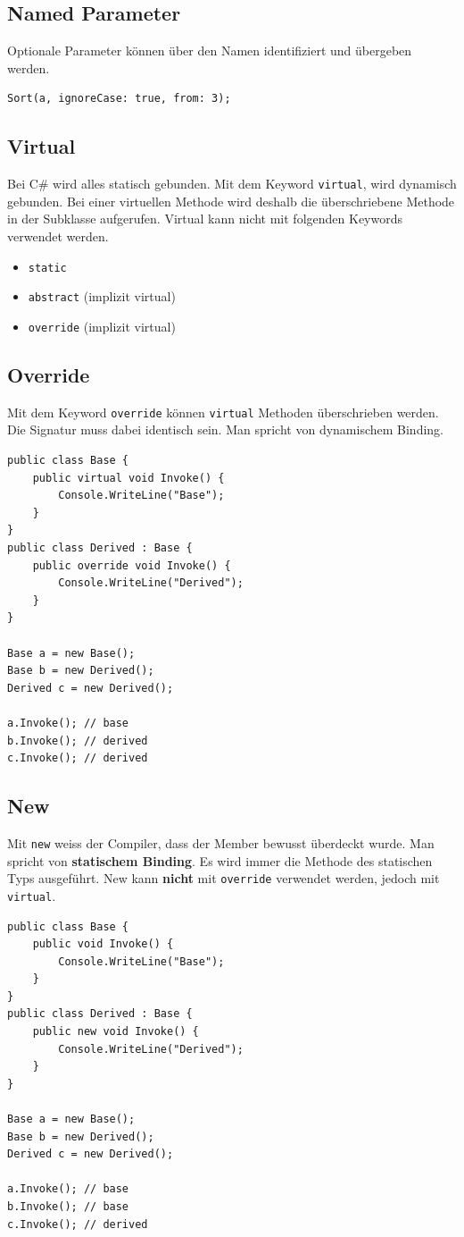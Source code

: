 \subsection{Named Parameter}
Optionale Parameter können über den Namen identifiziert und übergeben werden.
\begin{lstlisting}
Sort(a, ignoreCase: true, from: 3);
\end{lstlisting}

\subsection{Virtual}
Bei C\# wird alles statisch gebunden. Mit dem Keyword \lstinline|virtual|, wird dynamisch gebunden. Bei einer virtuellen Methode wird deshalb die überschriebene Methode in der Subklasse aufgerufen. Virtual kann nicht mit folgenden Keywords verwendet werden.
\begin{itemize}
	\item \lstinline|static|
	\item \lstinline|abstract| (implizit virtual)
	\item \lstinline|override| (implizit virtual)
\end{itemize} 

\subsection{Override}
Mit dem Keyword \lstinline|override| können \lstinline|virtual| Methoden überschrieben werden. Die Signatur muss dabei identisch sein. Man spricht von dynamischem Binding.


\begin{lstlisting}
public class Base {
	public virtual void Invoke() {
		Console.WriteLine("Base");
	}
}
public class Derived : Base {
	public override void Invoke() {
		Console.WriteLine("Derived");
	}
}

Base a = new Base();
Base b = new Derived();
Derived c = new Derived();

a.Invoke(); // base
b.Invoke(); // derived
c.Invoke(); // derived
\end{lstlisting}

\clearpage

\subsection{New}
Mit \lstinline|new| weiss der Compiler, dass der Member bewusst überdeckt wurde. Man spricht von \textbf{statischem Binding}. Es wird immer die Methode des statischen Typs ausgeführt. New kann \textbf{nicht} mit \lstinline|override| verwendet werden, jedoch mit \lstinline|virtual|.
\begin{lstlisting} 
public class Base {
	public void Invoke() {
		Console.WriteLine("Base");
	}
}
public class Derived : Base {
	public new void Invoke() {
		Console.WriteLine("Derived");
	}
}

Base a = new Base();
Base b = new Derived();
Derived c = new Derived();

a.Invoke(); // base
b.Invoke(); // base
c.Invoke(); // derived
\end{lstlisting}

